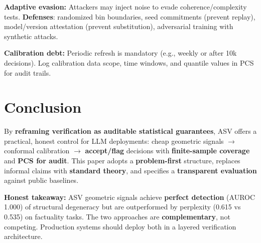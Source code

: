 \documentclass[10pt]{article}
\begin{document}
\textbf{Adaptive evasion:} Attackers may inject noise to evade coherence/complexity tests. \textbf{Defenses}: randomized bin boundaries, seed commitments (prevent replay), model/version attestation (prevent substitution), adversarial training with synthetic attacks.

\textbf{Calibration debt:} Periodic refresh is mandatory (e.g., weekly or after 10k decisions). Log calibration data scope, time windows, and quantile values in PCS for audit trails.

\section{Conclusion}
\label{sec:conclusion}

By \textbf{reframing verification as auditable statistical guarantees}, ASV offers a practical, honest control for LLM deployments: cheap geometric signals $\rightarrow$ conformal calibration $\rightarrow$ \textbf{accept/flag} decisions with \textbf{finite-sample coverage} and \textbf{PCS for audit}. This paper adopts a \textbf{problem-first} structure, replaces informal claims with \textbf{standard theory}, and specifies a \textbf{transparent evaluation} against public baselines.

\textbf{Honest takeaway:} ASV geometric signals achieve \textbf{perfect detection} (AUROC 1.000) of structural degeneracy but are outperformed by perplexity (0.615 vs 0.535) on factuality tasks. The two approaches are \textbf{complementary}, not competing. Production systems should deploy both in a layered verification architecture.
\end{document}
